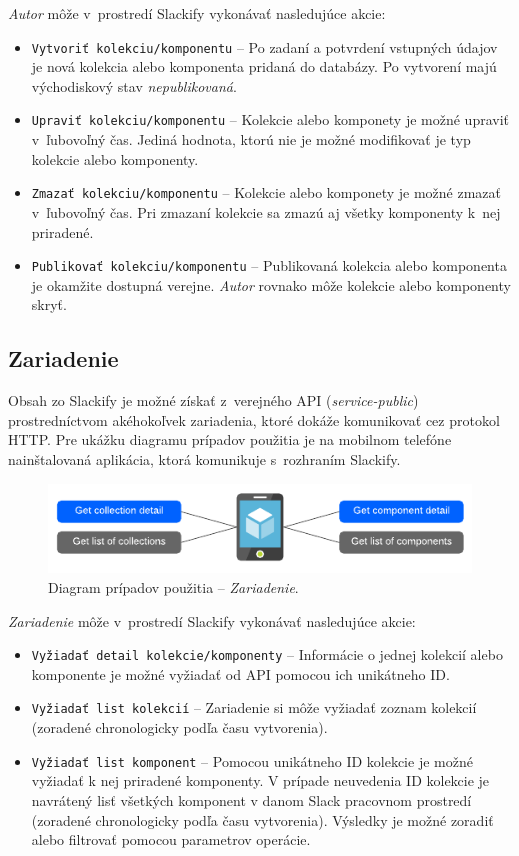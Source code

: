 \noindent \emph{Autor} môže v~prostredí Slackify vykonávať nasledujúce akcie:

\begin{itemize}
	\item \texttt{Vytvoriť kolekciu/komponentu} -- Po zadaní a potvrdení vstupných údajov je nová kolekcia alebo komponenta pridaná do databázy. Po vytvorení majú východiskový stav \emph{nepublikovaná}.
	\item \texttt{Upraviť kolekciu/komponentu} -- Kolekcie alebo komponety je možné upraviť v~ľubovoľný čas. Jediná hodnota, ktorú nie je možné modifikovať je typ kolekcie alebo komponenty.
	\item \texttt{Zmazať kolekciu/komponentu} -- Kolekcie alebo komponety je možné zmazať v~ľubovoľný čas. Pri zmazaní kolekcie sa zmazú aj všetky komponenty k~nej priradené.
	\item \texttt{Publikovať kolekciu/komponentu} -- Publikovaná kolekcia alebo komponenta je okamžite dostupná verejne. \emph{Autor} rovnako môže kolekcie alebo komponenty skryť.
\end{itemize}

\subsection{Zariadenie}
Obsah zo Slackify je možné získať z~verejného API (\emph{service-public}) prostredníctvom akéhokoľvek zariadenia, ktoré dokáže komunikovať cez protokol HTTP. Pre ukážku diagramu prípadov použitia je na mobilnom telefóne nainštalovaná aplikácia, ktorá komunikuje s~rozhraním Slackify.

\begin{figure}[h]
	\centering
	\includegraphics[scale=1.4]{obrazky-figures/device_user_case}
	\caption{Diagram prípadov použitia -- \emph{Zariadenie}.}
\end{figure}

\noindent \emph{Zariadenie} môže v~prostredí Slackify vykonávať nasledujúce akcie:

\begin{itemize}
	\item \texttt{Vyžiadať detail kolekcie/komponenty} -- Informácie o jednej kolekcií alebo komponente je možné vyžiadať od API pomocou ich unikátneho ID.
	\item \texttt{Vyžiadať list kolekcií} -- Zariadenie si môže vyžiadať zoznam kolekcií (zoradené chronologicky podľa času vytvorenia).
	\item \texttt{Vyžiadať list komponent} -- Pomocou unikátneho ID kolekcie je možné vyžiadať k nej priradené komponenty. V prípade neuvedenia ID kolekcie je navrátený lisť všetkých komponent v danom Slack pracovnom prostredí (zoradené chronologicky podľa času vytvorenia). Výsledky je možné zoradiť alebo filtrovať pomocou parametrov operácie.
\end{itemize}
